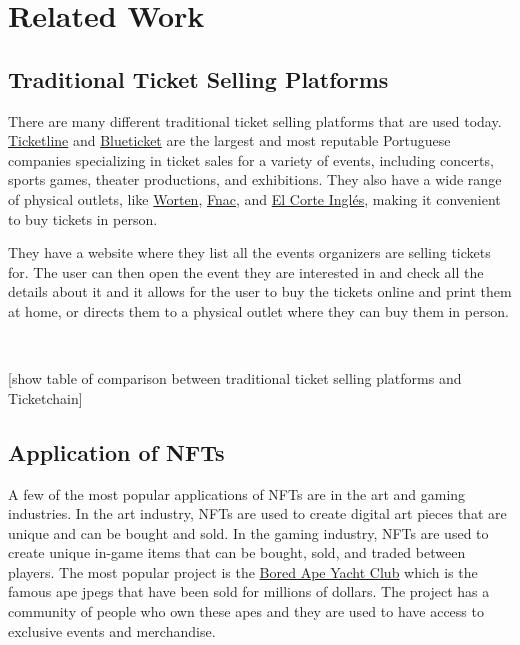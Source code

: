\section{Related Work}
\label{sec:related_work}

\subsection{Traditional Ticket Selling Platforms}
\label{subsec:traditional_ticket_selling_platforms}

There are many different traditional ticket selling platforms that are used today. \href{https://ticketline.sapo.pt/}{Ticketline} and \href{https://blueticket.meo.pt/}{Blueticket} are the largest and most reputable Portuguese companies specializing in ticket sales for a variety of events, including concerts, sports games, theater productions, and exhibitions. They also have a wide range of physical outlets, like \href{https://www.worten.pt/}{Worten}, \href{https://www.fnac.pt/}{Fnac}, and \href{https://www.elcorteingles.pt/}{El Corte Inglés}, making it convenient to buy tickets in person.

They have a website where they list all the events organizers are selling tickets for. The user can then open the event they are interested in and check all the details about it and it allows for the user to buy the tickets online and print them at home, or directs them to a physical outlet where they can buy them in person.

~

[show table of comparison between traditional ticket selling platforms and Ticketchain]

\subsection{Application of NFTs}
\label{subsec:application_of_nfts}

A few of the most popular applications of NFTs are in the art and gaming industries. In the art industry, NFTs are used to create digital art pieces that are unique and can be bought and sold. In the gaming industry, NFTs are used to create unique in-game items that can be bought, sold, and traded between players.
The most popular project is the \href{https://www.boredapeyachtclub.com/}{Bored Ape Yacht Club} which is the famous ape jpegs that have been sold for millions of dollars. The project has a community of people who own these apes and they are used to have access to exclusive events and merchandise.